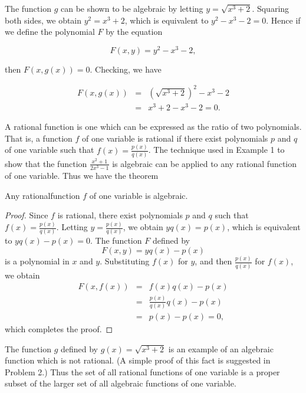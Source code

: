 The function $g$ can be shown to be algebraic by letting $y = \sqrt{x^3 + 2}$. Squaring both sides, we
obtain $y^2 = x^3 + 2$, which is equivalent to $y^2 - x^3 - 2 = 0$. Hence if we define the polynomial $F$ by the equation

$$
F(x, y) = y^2 - x^3 - 2, 
$$

\noindent then $F(x, g(x)) = 0$. Checking, we have

\begin{eqnarray*}
F(x, g(x)) &=& (\sqrt {x^3 + 2})^2 - x^3 - 2\\
               &=& x^3 + 2 - x^3 - 2 = 0.
\end{eqnarray*}


A rational function is one which can be expressed as the ratio of two polynomials. That is, a
function $f$ of one variable is rational if there exist polynomials $p$ and $q$ of one variable such that $f(x) = \frac{p(x)}{q(x)}$. The technique used in Example 1 to show that the function $\frac{x^2 + 1}{2x^3 - 1}$ is algebraic can be applied to any rational function of one variable. Thus we have the theorem

\begin{theorem} %
Any rationalfunction $f$ of one variable is algebraic.
\end{theorem}


\begin{proof}
Since $f$ is rational, there exist polynomials $p$ and $q$ such that $f(x) = \frac{p(x)}{q(x)}$.
Letting $y = \frac{p(x)}{q(x)}$, we obtain $yq(x) = p(x)$, which is equivalent to $yq(x)-p(x) = 0$. The function $F$ defined by
$$
F(x, y) = yq(x) - p(x)
$$
is a polynomial in $x$ and $y$. Substituting $f(x)$ for $y$, and then $\frac{p(x)}{q(x)}$ for $f(x)$, 
we obtain 
\begin{eqnarray*}
F(x, f(x)) &=& f(x)q(x) - p(x)\\
              &=& \frac{p(x)}{q(x)} q(x) - p(x)\\
              &=& p(x) - p(x) = 0, 
\end{eqnarray*}
which completes the proof.
\end{proof}

The function $g$ defined by $g(x) = \sqrt{x^3 + 2}$ is an example of an algebraic function which is not rational.  (A simple proof of this fact is suggested in Problem 2.) Thus the set of all rational functions of one variable is a proper subset of the larger set of all algebraic functions of one variable.

